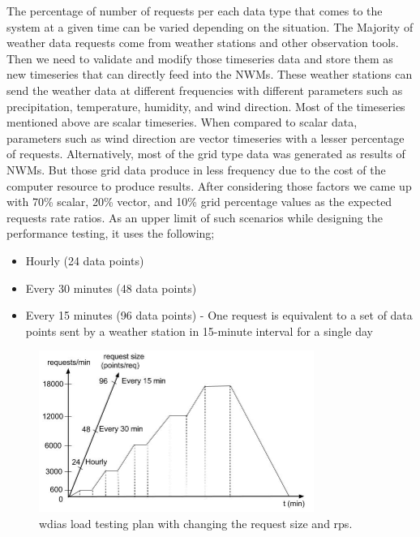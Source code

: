 The percentage of number of requests per each data type that comes to the system at a given time can be varied depending on the situation. The Majority of weather data requests come from weather stations and other observation tools. Then we need to validate and modify those timeseries data and store them as new timeseries that can directly feed into the NWMs. These weather stations can send the weather data at different frequencies with different parameters such as precipitation, temperature, humidity, and wind direction. Most of the timeseries mentioned above are scalar timeseries. When compared to scalar data, parameters such as wind direction are vector timeseries with a lesser percentage of requests. Alternatively, most of the grid type data was generated as results of NWMs. But those grid data produce in less frequency due to the cost of the computer resource to produce results. After considering those factors we came up with 70\% scalar, 20\% vector, and 10\% grid percentage values as the expected requests rate ratios.
As an upper limit of such scenarios while designing the performance testing, it uses the following;
\begin{itemize}
    \item Hourly (24 data points)
    \item Every 30 minutes (48 data points)
    \item Every 15 minutes (96 data points) - One request is equivalent to a set of data points sent by a weather station in 15-minute interval for a single day
\end{itemize}

\begin{figure}[htp]
    \centering
    \includegraphics[width=0.8\textwidth]{results/work_load/performance_study_v4.jpg}
    \caption{\acrshort{wdias} load testing plan with changing the request size and \acrshort{rps}.}
    \label{fi:performance_study_load}
\end{figure}

